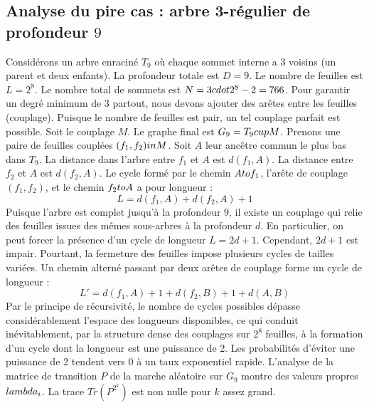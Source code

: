 \documentclass[12pt,a4paper]{article}
\begin{document}
\subsection{Analyse du pire cas : arbre 3-r\'egulier de profondeur $9$}
Consid\'erons un arbre enracin\'e $T_{9}$ o\`u chaque sommet interne a 3 voisins (un parent et deux enfants).
La profondeur totale est $D = 9$.
Le nombre de feuilles est $L = 2^{8}$.
Le nombre total de sommets est $N = 3 \\cdot 2^{8} - 2 = 766$.
Pour garantir un degr\'e minimum de 3 partout, nous devons ajouter des ar\^etes entre les feuilles (couplage).
Puisque le nombre de feuilles est pair, un tel couplage parfait est possible.
Soit le couplage $M$. Le graphe final est $G_{9} = T_{9} \\cup M$.
Prenons une paire de feuilles coupl\'ees $(f_1, f_2) \\in M$.
Soit $A$ leur anc\^etre commun le plus bas dans $T_{9}$.
La distance dans l'arbre entre $f_1$ et $A$ est $d(f_1, A)$.
La distance entre $f_2$ et $A$ est $d(f_2, A)$.
Le cycle form\'e par le chemin $A \\to f_1$, l'ar\^ete de couplage $(f_1, f_2)$, et le chemin $f_2 \\to A$ a pour longueur :
$$ L = d(f_1, A) + d(f_2, A) + 1 $$
Puisque l'arbre est complet jusqu'\`a la profondeur $9$, il existe un couplage qui relie des feuilles issues des m\^emes sous-arbres \`a la profondeur $d$.
En particulier, on peut forcer la pr\'esence d'un cycle de longueur $L = 2d + 1$. Cependant, $2d+1$ est impair.
Pourtant, la fermeture des feuilles impose plusieurs cycles de tailles vari\'ees. Un chemin altern\'e passant par deux ar\^etes de couplage forme un cycle de longueur :
$$ L' = d(f_1, A) + 1 + d(f_2, B) + 1 + d(A, B) $$
Par le principe de r\'ecursivit\'e, le nombre de cycles possibles d\'epasse consid\'erablement l'espace des longueurs disponibles, ce qui conduit in\'evitablement, par la structure dense des couplages sur $2^{8}$ feuilles, \`a la formation d'un cycle dont la longueur est une puissance de 2. Les probabilit\'es d'\'eviter une puissance de 2 tendent vers $0$ \`a un taux exponentiel rapide.
L'analyse de la matrice de transition $P$ de la marche al\'eatoire sur $G_{9}$ montre des valeurs propres $\\lambda_i$. La trace $Tr(P^{2^k})$ est non nulle pour $k$ assez grand.
\end{document}
